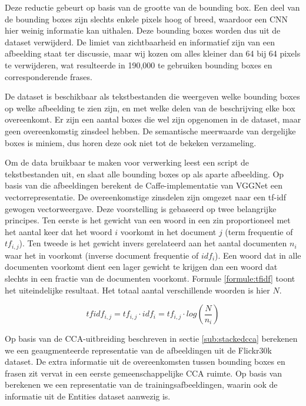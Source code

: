 Deze reductie gebeurt op basis van de grootte van de bounding box. Een deel van de bounding boxes zijn slechts enkele pixels hoog of breed, waardoor een CNN hier weinig informatie kan uithalen. Deze bounding boxes worden dus uit de dataset verwijderd. De limiet van zichtbaarheid en informatief zijn van een afbeelding staat ter discussie, maar wij kozen om alles kleiner dan 64 bij 64 pixels te verwijderen, wat resulteerde in 190,000 te gebruiken bounding boxes en corresponderende frases. 

De dataset is beschikbaar als tekstbestanden die weergeven welke bounding boxes op welke afbeelding te zien zijn, en met welke delen van de beschrijving elke box overeenkomt. Er zijn een aantal boxes die wel zijn opgenomen in de dataset, maar geen overeenkomstig zinsdeel hebben. De semantische meerwaarde van dergelijke boxes is miniem, dus horen deze ook niet tot de bekeken verzameling. 

Om de data bruikbaar te maken voor verwerking leest een script de tekstbestanden uit, en slaat alle bounding boxes op als aparte afbeelding. Op basis van die afbeeldingen berekent de Caffe-implementatie van VGGNet een vectorrepresentatie. De overeenkomstige zinsdelen zijn omgezet naar een tf-idf gewogen vectorweergave. Deze voorstelling is gebaseerd op twee belangrijke principes. Ten eerste is het gewicht van een woord in een zin proportioneel met het aantal keer dat het woord $i$ voorkomt in het document $j$ (term frequentie of $tf_{i,j}$). Ten tweede is het gewicht invers gerelateerd aan het aantal documenten $n_i$ waar het in voorkomt (inverse document frequentie of $idf_i$). Een woord dat in alle documenten voorkomt dient een lager gewicht te krijgen dan een woord dat slechts in een fractie van de documenten voorkomt. Formule \ref{formule:tfidf} toont het uiteindelijke resultaat. Het totaal aantal verschillende woorden is hier $N$\cite{Jurafsky:2009:SLP:1214993}. 

\begin{equation}
\label{formule:tfidf}
	tfidf_{i,j} = tf_{i,j}\cdot{idf_{i}} = tf_{i,j}\cdot{log(\frac{N}{n_i})}
\end{equation}

Op basis van de CCA-uitbreiding beschreven in sectie \ref{sub:stackedcca} berekenen we een geaugmenteerde representatie van de afbeeldingen uit de Flickr30k dataset. De extra informatie uit de overeenkomsten tussen bounding boxes en frasen zit vervat in een eerste gemeenschappelijke CCA ruimte. Op basis van \cite{Gong2014} berekenen we een representatie van de trainingsafbeeldingen, waarin ook de informatie uit de Entities dataset aanwezig is.

